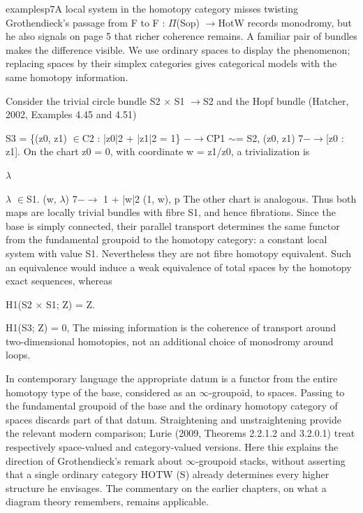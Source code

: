 \begin{dcomment}{examples}{p7}{A local system in the homotopy category misses twisting}
Grothendieck’s passage from F to F\textasciimacron{} : \ensuremath{\Pi}(Sop) \ensuremath{\to}HotW records monodromy, but he also signals on page 5 that richer coherence remains. A familiar pair of bundles makes the difference visible. We use ordinary spaces to display the phenomenon; replacing spaces by their simplex categories gives categorical models with the same homotopy information.

Consider the trivial circle bundle S2 \ensuremath{\times} S1 \ensuremath{\to}S2 and the Hopf bundle (Hatcher, 2002, Examples 4.45 and 4.51)

S3 = \{(z0, z1) \ensuremath{\in}C2 : |z0|2 + |z1|2 = 1\} \ensuremath{-}\ensuremath{\to}CP1 \ensuremath{\sim}= S2, (z0, z1) 7\ensuremath{-}\ensuremath{\to}[z0 : z1]. On the chart z0 = 0, with coordinate w = z1/z0, a trivialization is

\ensuremath{\lambda}

\ensuremath{\lambda} \ensuremath{\in}S1. (w, \ensuremath{\lambda}) 7\ensuremath{-}\ensuremath{\to} 1 + |w|2 (1, w), p The other chart is analogous. Thus both maps are locally trivial bundles with fibre S1, and hence fibrations. Since the base is simply connected, their parallel transport determines the same functor from the fundamental groupoid to the homotopy category: a constant local system with value S1. Nevertheless they are not fibre homotopy equivalent. Such an equivalence would induce a weak equivalence of total spaces by the homotopy exact sequences, whereas

H1(S2 \ensuremath{\times} S1; Z) = Z.

H1(S3; Z) = 0, The missing information is the coherence of transport around two-dimensional homotopies, not an additional choice of monodromy around loops.

In contemporary language the appropriate datum is a functor from the entire homotopy type of the base, considered as an \ensuremath{\infty}-groupoid, to spaces. Passing to the fundamental groupoid of the base and the ordinary homotopy category of spaces discards part of that datum. Straightening and unstraightening provide the relevant modern comparison; Lurie (2009, Theorems 2.2.1.2 and 3.2.0.1) treat respectively space-valued and category-valued versions. Here this explains the direction of Grothendieck’s remark about \ensuremath{\infty}-groupoid stacks, without asserting that a single ordinary category HOTW (S) already determines every higher structure he envisages. The commentary on the earlier chapters, on what a diagram theory remembers, remains applicable.


\end{dcomment}
